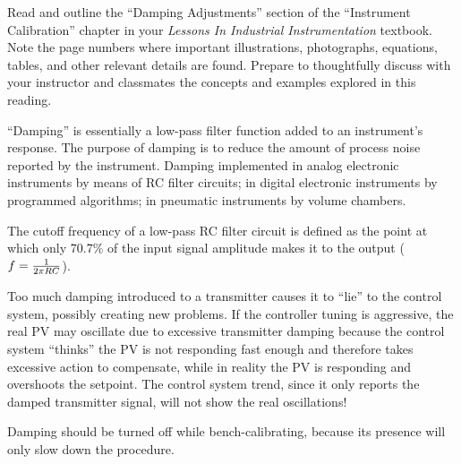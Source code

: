 

Read and outline the ``Damping Adjustments'' section of the ``Instrument Calibration'' chapter in your {\it Lessons In Industrial Instrumentation} textbook.  Note the page numbers where important illustrations, photographs, equations, tables, and other relevant details are found.  Prepare to thoughtfully discuss with your instructor and classmates the concepts and examples explored in this reading.














``Damping'' is essentially a low-pass filter function added to an instrument's response.  The purpose of damping is to reduce the amount of process noise reported by the instrument.  Damping implemented in analog electronic instruments by means of RC filter circuits; in digital electronic instruments by programmed algorithms; in pneumatic instruments by volume chambers.

\vskip 10pt

The cutoff frequency of a low-pass RC filter circuit is defined as the point at which only 70.7\% of the input signal amplitude makes it to the output ($f = {1 \over 2 \pi RC}$).

\vskip 10pt

Too much damping introduced to a transmitter causes it to ``lie'' to the control system, possibly creating new problems.  If the controller tuning is aggressive, the real PV may oscillate due to excessive transmitter damping because the control system ``thinks'' the PV is not responding fast enough and therefore takes excessive action to compensate, while in reality the PV is responding and overshoots the setpoint.  The control system trend, since it only reports the damped transmitter signal, will not show the real oscillations!

\vskip 10pt

Damping should be turned off while bench-calibrating, because its presence will only slow down the procedure.

















